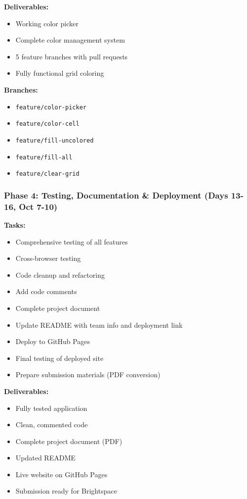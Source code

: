 \documentclass[11pt,a4paper]{article}
\begin{document}
\textbf{Deliverables:}
\begin{itemize}[leftmargin=*]
    \item Working color picker
    \item Complete color management system
    \item 5 feature branches with pull requests
    \item Fully functional grid coloring
\end{itemize}

\textbf{Branches:}
\begin{itemize}[leftmargin=*]
    \item \texttt{feature/color-picker}
    \item \texttt{feature/color-cell}
    \item \texttt{feature/fill-uncolored}
    \item \texttt{feature/fill-all}
    \item \texttt{feature/clear-grid}
\end{itemize}

\subsubsection{Phase 4: Testing, Documentation \& Deployment (Days 13-16, Oct 7-10)}
\textbf{Tasks:}
\begin{itemize}[leftmargin=*]
    \item Comprehensive testing of all features
    \item Cross-browser testing
    \item Code cleanup and refactoring
    \item Add code comments
    \item Complete project document
    \item Update README with team info and deployment link
    \item Deploy to GitHub Pages
    \item Final testing of deployed site
    \item Prepare submission materials (PDF conversion)
\end{itemize}

\textbf{Deliverables:}
\begin{itemize}[leftmargin=*]
    \item Fully tested application
    \item Clean, commented code
    \item Complete project document (PDF)
    \item Updated README
    \item Live website on GitHub Pages
    \item Submission ready for Brightspace
\end{itemize}
\end{document}

